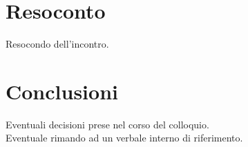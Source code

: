 \section{Resoconto}
Resocondo dell'incontro.

\section{Conclusioni}
Eventuali decisioni prese nel corso del colloquio. \\
Eventuale rimando ad un verbale interno di riferimento.